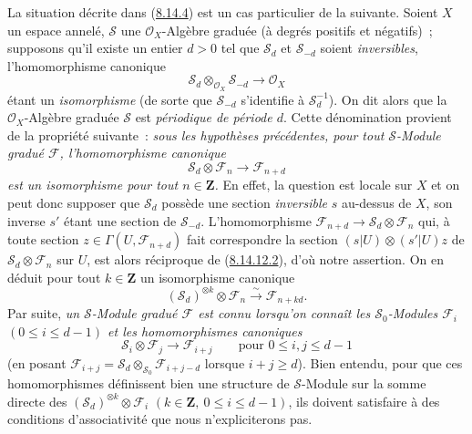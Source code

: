 \begin{remark}[8.14.12]
\label{II.8.14.12-fr}
La situation décrite dans (\hyperref[II.8.14.4-fr]{8.14.4}) est un cas
particulier de la suivante. Soient $X$ un espace annelé, $\mathcal{S}$ une
$\mathcal{O}_X$-Algèbre graduée (à degrés positifs et négatifs)~; supposons
qu'il existe un entier $d>0$ tel que $\mathcal{S}_d$ et
$\mathcal{S}_{-d}$ soient \emph{inversibles}, l'homomorphisme canonique
\begin{equation}
\label{II.8.14.12.1-fr}
  \mathcal{S}_d\otimes_{\mathcal{O}_X}\mathcal{S}_{-d}
  \to\mathcal{O}_X
\tag{8.14.12.1}
\end{equation}
étant un \emph{isomorphisme} (de sorte que $\mathcal{S}_{-d}$ s'identifie à
$\mathcal{S}_d^{-1}$). On dit alors que la $\mathcal{O}_X$-Algèbre graduée
$\mathcal{S}$ est \emph{périodique de période $d$}. Cette dénomination
provient de la propriété suivante~: \emph{sous les hypothèses précédentes,
pour tout $\mathcal{S}$-Module gradué $\mathcal{F}$, l'homomorphisme
canonique}
\begin{equation}
\label{II.8.14.12.2-fr}
  \mathcal{S}_d\otimes\mathcal{F}_n\to\mathcal{F}_{n+d}
\tag{8.14.12.2}
\end{equation}
\emph{est un isomorphisme pour tout $n\in\mathbf{Z}$.} En effet, la question
est locale sur $X$ et on peut donc supposer que $\mathcal{S}_d$ possède une
section \emph{inversible} $s$ au-dessus de $X$, son inverse $s'$ étant une
section de $\mathcal{S}_{-d}$. L'homomorphisme
$\mathcal{F}_{n+d}\to\mathcal{S}_d\otimes\mathcal{F}_n$ qui, à toute section
$z\in\Gamma(U,\mathcal{F}_{n+d})$ fait correspondre la section
$(s|U)\otimes(s'|U)z$ de $\mathcal{S}_d\otimes\mathcal{F}_n$ sur $U$, est
alors réciproque de (\hyperref[II.8.14.12.2-fr]{8.14.12.2}), d'où notre
assertion. On en déduit pour tout $k\in\mathbf{Z}$ un isomorphisme canonique
\[
  (\mathcal{S}_d)^{\otimes k}\otimes\mathcal{F}_n
  \xrightarrow{\sim}\mathcal{F}_{n+kd}.
\]
Par suite, \emph{un $\mathcal{S}$-Module gradué $\mathcal{F}$ est connu
lorsqu'on connaît les $\mathcal{S}_0$-Modules $\mathcal{F}_i$
$(0\leqslant i\leqslant d-1)$ et les homomorphismes canoniques}
\[
  \mathcal{S}_i\otimes\mathcal{F}_j\to\mathcal{F}_{i+j}
  \qquad\text{pour }0\leqslant i,j\leqslant d-1
\]
(en posant
$\mathcal{F}_{i+j}=\mathcal{S}_d\otimes_{\mathcal{S}_0}
\mathcal{F}_{i+j-d}$ lorsque $i+j\geqslant d$). Bien entendu, pour que ces
homomorphismes définissent bien une structure de $\mathcal{S}$-Module sur la
somme directe des $(\mathcal{S}_d)^{\otimes k}\otimes\mathcal{F}_i$
$(k\in\mathbf{Z},\ 0\leqslant i\leqslant d-1)$, ils doivent satisfaire à des
conditions d'associativité que nous n'expliciterons pas.


\end{remark}
